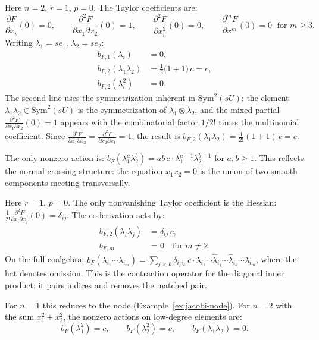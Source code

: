 \begin{example}[Normal crossing: $F(x_1, x_2) = x_1 x_2$, two variables]
\label{ex:jacobi-normal-crossing}
Here $n = 2$, $r = 1$, $p = 0$. The Taylor coefficients are:
\[
\frac{\partial F}{\partial x_i}(0) = 0, \qquad
\frac{\partial^2 F}{\partial x_1 \partial x_2}(0) = 1, \qquad
\frac{\partial^2 F}{\partial x_i^2}(0) = 0, \qquad
\frac{\partial^m F}{\partial x^m}(0) = 0 \;\text{ for } m \geq 3.
\]
Writing $\lambda_1 = se_1$, $\lambda_2 = se_2$:
\begin{align*}
b_{F,1}(\lambda_i) &= 0, \\
b_{F,2}(\lambda_1 \lambda_2) &= \tfrac{1}{2}\bigl(1 + 1\bigr)\, c
= c, \\
b_{F,2}(\lambda_i^2) &= 0.
\end{align*}
The second line uses the symmetrization inherent in $\mathrm{Sym}^2(sU)$:
the element $\lambda_1 \lambda_2 \in \mathrm{Sym}^2(sU)$ is the symmetrization
of $\lambda_1 \otimes \lambda_2$, and the mixed partial
$\frac{\partial^2 F}{\partial x_1 \partial x_2}(0) = 1$ appears with
the combinatorial factor $1/2!$ times the multinomial coefficient. Since
$\frac{\partial^2 F}{\partial x_1 \partial x_2} =
\frac{\partial^2 F}{\partial x_2 \partial x_1} = 1$,
the result is $b_{F,2}(\lambda_1 \lambda_2)
= \frac{1}{2!}(1 + 1)\, c = c$.

The only nonzero action is:
$b_F(\lambda_1^{a}\lambda_2^{b}) = ab\, c\cdot\lambda_1^{a-1}\lambda_2^{b-1}$
for $a, b \geq 1$. This reflects the normal-crossing structure:
the equation $x_1 x_2 = 0$ is the union of two smooth components meeting
transversally.
\end{example}

\begin{example}[Quadric: $F(x_1, \ldots, x_n) = \sum_{i=1}^n x_i^2$]
\label{ex:jacobi-quadric}
Here $r = 1$, $p = 0$. The only nonvanishing Taylor coefficient is the
Hessian: $\frac{1}{2!}\frac{\partial^2 F}{\partial x_i \partial x_j}(0)
= \delta_{ij}$. The coderivation acts by:
\begin{align*}
b_{F,2}(\lambda_i \lambda_j) &= \delta_{ij}\, c, \\
b_{F,m} &= 0 \quad\text{for } m \neq 2.
\end{align*}
On the full coalgebra: $b_F(\lambda_{i_1} \cdots \lambda_{i_m})
= \sum_{j < k} \delta_{i_j i_k}\, c \cdot
\lambda_{i_1} \cdots \widehat{\lambda}_{i_j} \cdots
\widehat{\lambda}_{i_k} \cdots \lambda_{i_m}$,
where the hat denotes omission. This is the contraction operator
for the diagonal inner product: it pairs indices and removes the
matched pair.

For $n = 1$ this reduces to the node (Example~\ref{ex:jacobi-node}).
For $n = 2$ with the sum $x_1^2 + x_2^2$, the nonzero actions on
low-degree elements are:
\[
b_F(\lambda_1^2) = c, \qquad
b_F(\lambda_2^2) = c, \qquad
b_F(\lambda_1 \lambda_2) = 0.
\]
\end{example}

